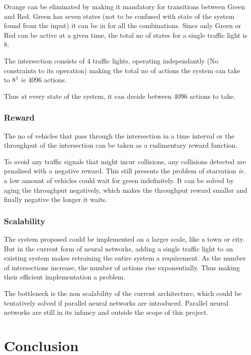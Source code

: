 \documentclass[a4paper,11pt]{article}
\begin{document}
				Orange can be eliminated by making it mandatory for transitions between Green and Red. Green has seven states (not to be confused with state of the system found from the input) it can be in for all the combinations. Since only Green or Red can be active at a given time, the total no of states for a single traffic light is 8.

				The intersection consists of 4 traffic lights, operating independantly (No constraints to its operation) making the total no of actions the system can take to $8^4$ \emph{ie} 4096 actions.

				Thus at every state of the system, it can decide between 4096 actions to take.
			\subsubsection{Reward}
				The no of vehicles that pass through the intersection in a time interval or the throughput of the intersection can be taken as a rudimentary reward function.

				To avoid any traffic signals that might incur collisions, any collisions detected are penalised with a negative reward. This still presents the problem of starvation \emph{ie.} a low amount of vehicles could wait for green indefinitely. It can be solved by aging the throughput negatively, which makes the throughput reward smaller and finally negative the longer it waits.
			\subsubsection{Scalability}
				The system proposed could be implemented on a larger scale, like a town or city. But in the current form of neural networks, adding a single traffic light to an existing system makes retraining the entire system a requirement. As the number of intersections increase, the number of actions rise exponentially. Thus making their efficient implementation a problem.

				The bottleneck is the non scalability of the current architecture, which could be tentatively solved if parallel neural networks are introduced. Parallel neural networks are still in its infancy and outside the scope of this project.
	\section{Conclusion}



	\newpage
	\nocite{*}
	
	
\end{document}
